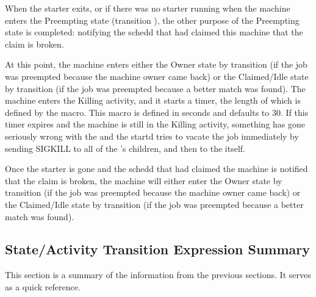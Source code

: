When the starter exits, or if there was no starter running when the
machine enters the Preempting state (transition ),
the other purpose of the Preempting state is completed:
notifying the schedd that had claimed this machine that the claim is
broken.

At this point, the machine enters either the Owner state by
transition  (if the job was preempted because the machine
owner came back) or the Claimed/Idle state by transition 
(if the job was preempted because a better match was found).
The machine enters the Killing activity, and it starts a timer, the
length of which is defined by the 
\label{param:KillingTimeout} macro.
This macro is defined in seconds and defaults to 30.
If this timer expires and the machine is still in
the Killing activity, something has gone seriously wrong with the
 and the startd tries to vacate the job immediately by
sending SIGKILL to all of the 's children, and then to
the  itself.

Once the starter is gone and the schedd that had claimed the
machine is notified that the claim is broken, the machine will either
enter the Owner state by transition  (if the job was
preempted because the machine owner came back) or the Claimed/Idle
state by transition  (if the job was preempted because a
better match was found). 

\subsection{\label{sec:State-Expression-Summary}
State/Activity Transition Expression Summary}
This section is a summary of the information from the
previous sections.
It serves as a quick reference.

